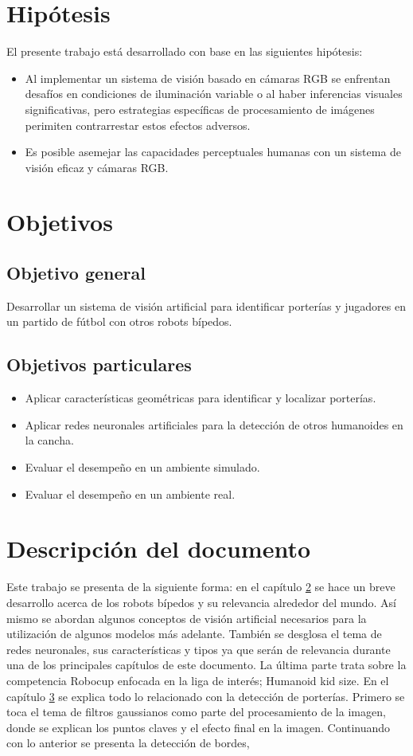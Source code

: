 \section{Hipótesis}
El presente trabajo está desarrollado con base en las siguientes hipótesis:
\begin{itemize}
	\item Al implementar un sistema de visión basado en cámaras RGB se enfrentan desafíos en condiciones de iluminación variable o al haber inferencias visuales significativas, pero estrategias específicas de procesamiento de imágenes perimiten contrarrestar estos efectos adversos.
	\item Es posible asemejar las capacidades perceptuales humanas con un sistema de visión eficaz y cámaras RGB.
\end{itemize}

\section{Objetivos}


\subsection*{Objetivo general}
Desarrollar un sistema de visión artificial para identificar porterías y jugadores en un partido de fútbol con otros robots bípedos.
\subsection*{Objetivos particulares}
\begin{itemize}
    \item Aplicar características geométricas para identificar y localizar porterías.
    \item Aplicar redes neuronales artificiales para la detección de otros humanoides en la cancha.
    \item Evaluar el desempeño en un ambiente simulado.
    \item Evaluar el desempeño en un ambiente real.
\end{itemize}
\section{Descripción del documento}
Este trabajo se presenta de la siguiente forma: en el capítulo \hyperref[sec:marcoteorico]{2} se hace un breve desarrollo acerca de los robots bípedos y su relevancia alrededor del mundo. Así mismo se abordan algunos conceptos de visión artificial necesarios para la utilización de algunos modelos más adelante. También se desglosa el tema de redes neuronales, sus características y tipos ya que serán de relevancia durante una de los principales capítulos de este documento. La última parte trata sobre la competencia Robocup enfocada en la liga de interés; Humanoid kid size. En el capítulo \hyperref[sec:porteria]{3} se explica todo lo relacionado con la detección de porterías. Primero se toca el tema de filtros gaussianos como parte del procesamiento de la imagen, donde se explican los puntos claves y el efecto final en la imagen. Continuando con lo anterior se presenta la detección de bordes,   

